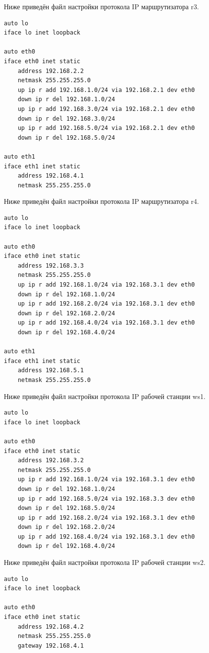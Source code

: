 \documentclass[a4paper,12pt]{article}
\begin{document}
Ниже приведён файл настройки протокола IP маршрутизатора r3.

\begin{Verbatim}
auto lo
iface lo inet loopback

auto eth0
iface eth0 inet static
    address 192.168.2.2
    netmask 255.255.255.0
    up ip r add 192.168.1.0/24 via 192.168.2.1 dev eth0
    down ip r del 192.168.1.0/24
    up ip r add 192.168.3.0/24 via 192.168.2.1 dev eth0
    down ip r del 192.168.3.0/24
    up ip r add 192.168.5.0/24 via 192.168.2.1 dev eth0
    down ip r del 192.168.5.0/24

auto eth1
iface eth1 inet static
    address 192.168.4.1
    netmask 255.255.255.0
\end{Verbatim}

Ниже приведён файл настройки протокола IP маршрутизатора r4.

\begin{Verbatim}
auto lo
iface lo inet loopback

auto eth0
iface eth0 inet static
    address 192.168.3.3
    netmask 255.255.255.0
    up ip r add 192.168.1.0/24 via 192.168.3.1 dev eth0
    down ip r del 192.168.1.0/24
    up ip r add 192.168.2.0/24 via 192.168.3.1 dev eth0
    down ip r del 192.168.2.0/24
    up ip r add 192.168.4.0/24 via 192.168.3.1 dev eth0
    down ip r del 192.168.4.0/24

auto eth1
iface eth1 inet static
    address 192.168.5.1
    netmask 255.255.255.0
\end{Verbatim}



Ниже приведён файл настройки протокола IP рабочей станции ws1.

\begin{Verbatim}
auto lo
iface lo inet loopback

auto eth0
iface eth0 inet static
	address 192.168.3.2
	netmask 255.255.255.0
	up ip r add 192.168.1.0/24 via 192.168.3.1 dev eth0
    down ip r del 192.168.1.0/24
	up ip r add 192.168.5.0/24 via 192.168.3.3 dev eth0
    down ip r del 192.168.5.0/24
	up ip r add 192.168.2.0/24 via 192.168.3.1 dev eth0
    down ip r del 192.168.2.0/24
	up ip r add 192.168.4.0/24 via 192.168.3.1 dev eth0
    down ip r del 192.168.4.0/24
\end{Verbatim}


Ниже приведён файл настройки протокола IP рабочей станции ws2.

\begin{Verbatim}
auto lo
iface lo inet loopback

auto eth0
iface eth0 inet static
    address 192.168.4.2
    netmask 255.255.255.0
    gateway 192.168.4.1
\end{Verbatim}
\end{document}
